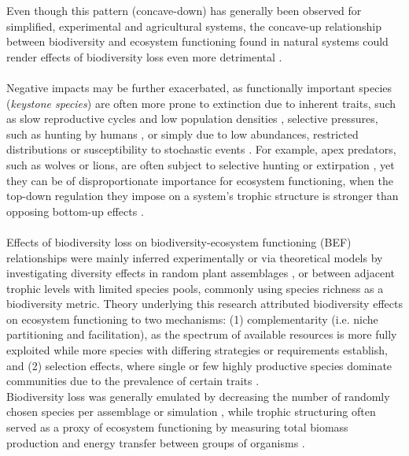 Even though this pattern (concave-down) has generally been observed for simplified, experimental and agricultural systems, the concave-up relationship between biodiversity and ecosystem functioning found in natural systems could render effects of biodiversity loss even more detrimental \citep{Cardinale2012,Mora2014}. \\\\
%
Negative impacts may be further exacerbated, as functionally important species (\emph{keystone species}) are often more prone to extinction due to inherent traits, such as slow reproductive cycles and low population densities \citep{Cardillo2005}, selective pressures, such as hunting by humans \citep{Dobson2006}, or simply due to low abundances, restricted distributions or susceptibility to stochastic events \citep{MacArthur1967,Smith2003}. For example,
apex predators, such as wolves or lions, are often subject to selective hunting or extirpation \citep{Dobson2006,Ripple2014}, yet they can be of disproportionate importance for ecosystem functioning, when the top-down regulation they impose on a system's trophic structure is stronger than opposing bottom-up effects \citep{Borer2006,Estes2011}. 
 \\\\
Effects of biodiversity loss on biodiversity-ecosystem functioning (BEF) relationships were mainly inferred experimentally or via theoretical models by investigating diversity effects in random plant assemblages \citep[e.g.][]{Tilman2001,Hector2007,Isbell2011}, or between adjacent trophic levels \citep[mostly plant-herbivore interactions, e.g.][]{Thebault2003,Bruno2008} with limited species pools, commonly using species richness as a biodiversity metric. Theory underlying this research attributed biodiversity effects on ecosystem functioning to two mechanisms: 
(1) complementarity (i.e. niche partitioning and facilitation), as the spectrum of available resources is more fully exploited while more species with differing strategies or requirements establish,
 and (2) selection effects, where single or few highly productive species dominate communities due to the prevalence of certain traits \citep{Loreau2001,Tilman2001}.\\
Biodiversity loss was generally emulated by decreasing the number of randomly chosen species per assemblage or simulation \citep{Tilman2001,Thebault2003,Ives2005}, while trophic structuring often served as a proxy of ecosystem functioning by measuring total biomass production and energy transfer between groups of organisms \citep[cf.][]{Tilman2014}.
